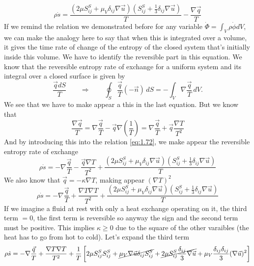 	  		\begin{equation}
	  			\rho \dot{s} = \frac{(2\mu S_{ij}^S + \mu _V \delta _{ij} \nabla \vec{u})\left(S_{ij}^S + \frac{1}{3}\delta _{ij}\nabla \vec{u}\right)}{T} - \frac{\nabla \vec{q}}{T}
	  			\label{eq:1.72}
	  		\end{equation}
	  		If we remind the relation we demonstrated before for any variable $\dot{\Phi} = \int _V \rho \dot{\phi} dV$, we can make the analogy here to say that when this is integrated over a volume, it gives the time rate of change of the entropy of the closed system that's initially inside this volume. We have to identify the reversible part in this equation. We know that the reversible entropy rate of exchange for a uniform system and its integral over a closed surface is given by
	  		\begin{equation}
	  			\frac{\vec{q}dS}{T} \qquad \Rightarrow \qquad \oint _S \frac{\vec{q}}{T}(-\vec{n})\, dS = -\int _V \nabla \frac{\vec{q}}{T} \, dV.
			\end{equation}	  		 
			We see that we have to make appear a this in the last equation. But we know that
			\begin{equation}
				\frac{\nabla \vec{q}}{T} = \nabla \frac{\vec{q}}{T} - \vec{q} \nabla \left(\frac{1}{T} \right) = \nabla \frac{\vec{q}}{T} + \vec{q} \frac{\nabla T}{T^2}
			\end{equation}
			And by introducing this into the relation \eqref{eq:1.72}, we make appear the reversible entropy rate of exchange
			\begin{equation}
				\rho \dot{s} = -\nabla \frac{\vec{q}}{T} - \frac{\vec{q}\nabla T}{T^2} + \frac{(2\mu S_{ij}^S + \mu _V \delta _{ij} \nabla \vec{u})\left(S_{ij}^S + \frac{1}{3}\delta _{ij}\nabla \vec{u}\right)}{T}
			\end{equation}
			We also know that $\vec{q} = -\kappa \nabla T$, making appear $(\nabla T)^2$
			\begin{equation}
				\rho \dot{s} = -\nabla \frac{\vec{q}}{T} + \frac{\nabla T\nabla T}{T^2} + \frac{(2\mu S_{ij}^S + \mu _V \delta _{ij} \nabla \vec{u})\left(S_{ij}^S + \frac{1}{3}\delta _{ij}\nabla \vec{u}\right)}{T}
			\end{equation}
			If we imagine a fluid at rest with only a heat exchange operating on it, the third term $=0$, the first term is reversible so anyway the sign and the second term must be positive. This implies $\kappa \geq 0$ due to the square of the other varaibles (the heat has to go from hot to cold). Let's expand the third term
			\begin{equation}
				\rho \dot{s} = -\nabla \frac{\vec{q}}{T} + \frac{\nabla T\nabla T}{T^2} + \frac{1}{T}\left[ 2\mu S_{ij}^S S_{ij}^S + \cancel{\mu _V \nabla \vec{u} \delta _{ij} S_{ij}^S} + \cancel{2\mu S_{ij}^S \frac{\delta _{ij}}{3} \nabla \vec{u}} + \mu _V \frac{\delta _{ij}\delta _{ij}}{3}(\nabla \vec{u})^2  \right]			
			\end{equation}			 
